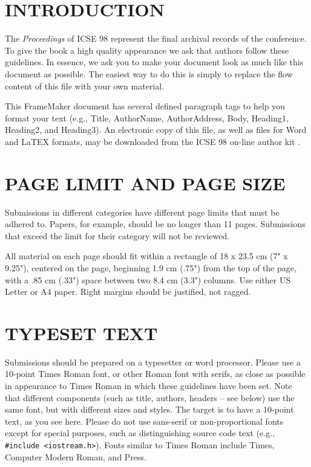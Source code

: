 \section{INTRODUCTION}
The {\it Proceedings} of ICSE 98 represent the final archival 
records of the conference. To give the book a high quality 
appearance we ask that authors follow these guidelines. In 
essence, we ask you to make your document look as much 
like this document as possible. The easiest way to do this is 
simply to replace the flow content of this file with your own 
material.
 
This FrameMaker document has several defined paragraph 
tags to help you format your text (e.g., Title, AuthorName, 
AuthorAddress, Body, Heading1, Heading2, and Heading3). 
An electronic copy of this file, as well as files for Word and 
LaTEX formats, may be downloaded from the ICSE 98 on-line author kit \cite{EAK}.

\section{PAGE LIMIT AND PAGE SIZE}
Submissions in different categories have different page 
limits that must be adhered to. Papers, for example, should 
be no longer than 11 pages. Submissions that exceed the 
limit for their category will not be reviewed.
 
All material on each page should fit within a rectangle of 
18 x 23.5 cm (7" x 9.25"), centered on the page, beginning 
1.9 cm (.75") from the top of the page, with a .85 cm (.33") 
space between two 8.4 cm (3.3") columns. Use either US 
Letter or A4 paper. Right margins should be justified, not 
ragged.

\section{TYPESET TEXT}
Submissions should be prepared on a typesetter or word 
processor. Please use a 10-point Times Roman font, or other 
Roman font with serifs, as close as possible in appearance to 
Times Roman in which these guidelines have been set. Note 
that different components (such as title, authors, headers -- 
see below) use the same font, but with different sizes and 
styles. The target is to have a 10-point text, as you see here. 
Please do not use sans-serif or non-proportional fonts except 
for special purposes, such as distinguishing source code text 
(e.g., \verb|#include <iostream.h>|). Fonts similar to Times 
Roman include Times, Computer Modern Roman, and Press.
 
